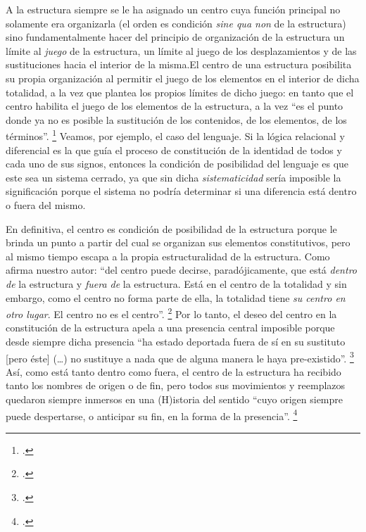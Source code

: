 A la estructura siempre se le ha asignado un centro cuya función principal no solamente era organizarla (el orden es condición \emph{sine qua non} de la estructura) sino fundamentalmente hacer del principio de organización de la estructura un límite al \emph{juego} de la  \linebreak estructura, un límite al juego de los desplazamientos y de las sustituciones hacia el interior de la misma.El centro de una estructura posibilita su propia organización al permitir el juego de los elementos en el interior de dicha totalidad, a la vez que plantea los propios límites de dicho juego: en tanto que el centro habilita el juego de los elementos de la estructura, a la vez \enquote{es el punto donde ya no es posible la sustitución de los contenidos, de los elementos, de los términos}. \footcite[][374]{@6997-DERRIDA1989} Veamos, por ejemplo, el caso del lenguaje. Si la lógica relacional y diferencial es la que guía el proceso de constitución de la identidad de todos y cada uno de sus signos, entonces la condición de posibilidad del lenguaje es que este sea un sistema cerrado, ya que sin dicha \emph{sistematicidad} sería imposible la significación porque el sistema no podría determinar si una diferencia está dentro o fuera del mismo.

En definitiva, el centro es condición de posibilidad de la estructura porque le brinda un punto a partir del cual se organizan sus elementos constitutivos, pero al mismo tiempo escapa a la propia estructuralidad de la estructura. Como afirma nuestro autor: \enquote{del centro puede decirse, paradójicamente, que está \emph{dentro de} la estructura y \emph{fuera de} la estructura. Está en el centro de la totalidad y sin embargo, como el centro no forma parte de ella, la totalidad tiene \emph{su centro en otro lugar}. El centro no es el centro}. \footcite[][384]{@6997-DERRIDA1989} Por lo tanto, el deseo del centro en la constitución de la estructura apela a una presencia central imposible porque desde siempre dicha presencia \enquote{ha estado deportada fuera de sí en su sustituto {[}pero éste{]} (\ldots) no sustituye a nada que de alguna manera le haya pre-existido}. \footcite[][385]{@6997-DERRIDA1989} Así, como está tanto dentro como fuera, el centro de la estructura ha recibido tanto los nombres de origen o de fin, pero todos sus movimientos y reemplazos quedaron siempre inmersos en una (H)istoria del sentido \enquote{cuyo origen siempre puede despertarse, o anticipar su fin, en la forma de la presencia}. \footcite[][384]{@6997-DERRIDA1989}

